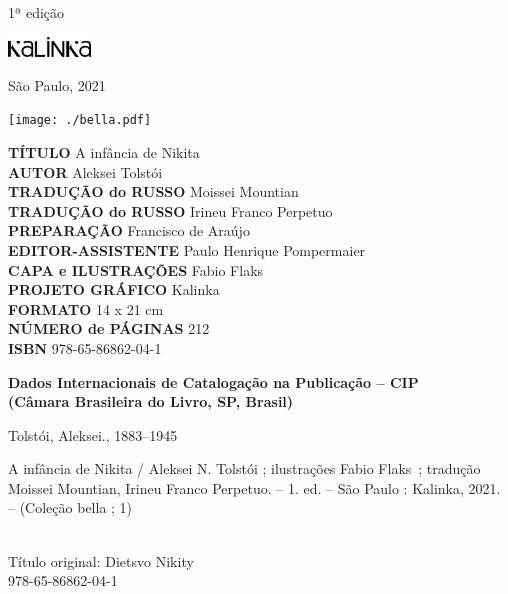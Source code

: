 {\vfill

\begin{center}
1ª edição

\smallskip

\includegraphics[width=2.2cm]{./LOGOTIPO_KALINKA.jpg}

São Paulo, 2021
\end{center}

\pagebreak
\flushleft
\pagestyle{empty}
\tiny



\texttt{[image: ./bella.pdf]}

\vfill

\textbf{TÍTULO} A infância de Nikita\\
\textbf{AUTOR} Aleksei Tolstói\\
\textbf{TRADUÇÃO do RUSSO} Moissei Mountian\\
\textbf{TRADUÇÃO do RUSSO} Irineu Franco Perpetuo\\
\textbf{PREPARAÇÃO} Francisco de Araújo\\
\textbf{EDITOR-ASSISTENTE} Paulo Henrique Pompermaier\\
\textbf{CAPA e ILUSTRAÇÕES} Fabio Flaks\\
\textbf{PROJETO GRÁFICO} Kalinka\\
\textbf{FORMATO} 14 x 21 cm\\
\textbf{NÚMERO de PÁGINAS} 212\\
\textbf{ISBN} 978-65-86862-04-1\\


\begin{flushleft}
\textbf{Dados Internacionais de Catalogação na Publicação -- CIP}\\
\textbf{(Câmara Brasileira do Livro, SP, Brasil)}\\
\hrulefill
\end{flushleft}
\hspace{5pt}Tolstói, Aleksei., 1883--1945\\
\hspace{20pt}\parbox{185pt}{A infância de Nikita / Aleksei N. Tolstói ; ilustrações Fabio Flaks~; tradução Moissei Mountian, Irineu Franco Perpetuo. -- 1. ed. -- São Paulo :
Kalinka, 2021. -- (Coleção bella ; 1)}\\[6pt]

\hspace{20pt}Título original: Dietsvo Nikity\\
\hspace{20pt} 978-65-86862-04-1\\[6pt]

}
